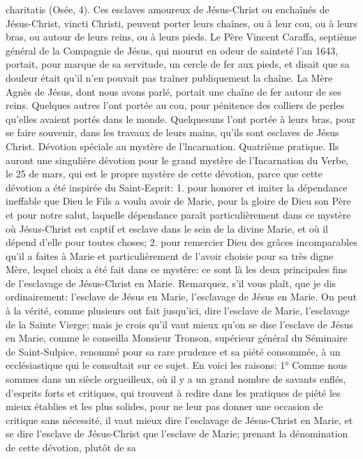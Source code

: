 charitatis (Osée, 4).
 Ces esclaves amoureux de Jésus-Christ ou enchaînés de Jésus-Christ, vincti Christi, peuvent porter leurs
chaînes, ou à leur cou, ou à leurs bras, ou autour de leurs reins, ou à leurs pieds. Le Père Vincent Caraffa,
septième général de la Compagnie de Jésus, qui mourut en odeur de sainteté l'an 1643, portait, pour marque de
sa servitude, un cercle de fer aux pieds, et disait que sa douleur était qu'il n'en pouvait pas traîner publiquement la
chaîne. La Mère Agnès de Jésus, dont nous avons parlé, portait une chaîne de fer autour de ses reins. Quelques
autres l'ont portée au cou, pour pénitence des colliers de perles qu'elles avaient portés dans le monde. Quelquesuns l'ont portée à leurs bras, pour se faire souvenir, dans les travaux de leurs mains, qu'ils sont esclaves de Jésus Christ.
Dévotion spéciale au mystère de l'lncarnation.
 Quatrième pratique. Ils auront une singulière dévotion pour le grand mystère de l'Incarnation du Verbe, le 25
de mars, qui est le propre mystère de cette dévotion, parce que cette dévotion a été inspirée du Saint-Esprit: 1.
pour honorer et imiter la dépendance ineffable que Dieu le Fils a voulu avoir de Marie, pour la gloire de Dieu son
Père et pour notre salut, laquelle dépendance paraît particulièrement dans ce mystère où Jésus-Christ est captif et
esclave dans le sein de la divine Marie, et où il dépend d'elle pour toutes choses; 2. pour remercier Dieu des
grâces incomparables qu'il a faites à Marie et particulièrement de l'avoir choisie pour sa très digne Mère, lequel
choix a été fait dans ce mystère: ce sont là les deux principales fins de l'esclavage de Jésus-Christ en Marie.
 Remarquez, s'il vous plaît, que je dis ordinairement: l'esclave de Jésus en Marie, l'esclavage de Jésus en
Marie. On peut à la vérité, comme plusieurs ont fait jusqu'ici, dire l'esclave de Marie, l'esclavage de la Sainte
Vierge; mais je crois qu'il vaut mieux qu'on se dise l'esclave de Jésus en Marie, comme le conseilla Monsieur
Tronson, supérieur général du Séminaire de Saint-Sulpice, renommé pour sa rare prudence et sa piété
consommée, à un ecclésiastique qui le consultait sur ce sujet. En voici les raisons:
 1° Comme nous sommes dans un siècle orgueilleux, où il y a un grand nombre de savants enflés, d'esprits
forts et critiques, qui trouvent à redire dans les pratiques de piété les mieux établies et les plus solides, pour ne
leur pas donner une occasion de critique sans nécessité, il vaut mieux dire l'esclavage de Jésus-Christ en Marie,
et se dire l'esclave de Jésus-Christ que l'esclave de Marie; prenant la dénomination de cette dévotion, plutôt de sa
